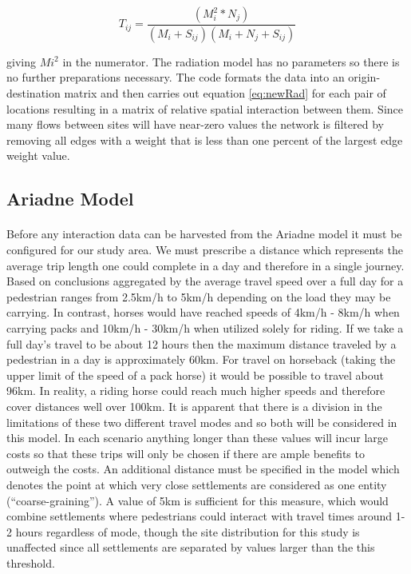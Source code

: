 \documentclass[12pt,a4paper]{thesis}
\begin{document}
				
				\begin{equation}						
				T_{ij} = \frac{(M_{i}^2*N_{j})}{(M_{i}+S_{ij})(M_{i}+N_{j}+S_{ij})}
				\label{eq:newRad}	
				\end{equation}
						
giving $Mi^2$ in the numerator. The radiation model has no parameters so there is no further preparations necessary. The code formats the data into an origin-destination matrix and then  carries out equation \ref{eq:newRad} for each pair of locations resulting in a matrix of relative spatial interaction between them. Since many flows between sites will have near-zero values the network is filtered by removing all edges with a weight that is less than one percent of the largest edge weight value. 

\subsection{Ariadne Model}
	
\paragraph{}
Before any interaction data can be harvested from the Ariadne model it must be configured for our study area. We must prescribe a distance which represents the average trip length one could complete in a day and therefore in a single journey. Based on conclusions aggregated by \cite{BevForthcoming} the average travel speed over a full day for a pedestrian ranges from 2.5km/h to 5km/h depending on the load they may be carrying. In contrast, horses would have reached speeds of 4km/h - 8km/h when carrying packs and 10km/h - 30km/h when utilized solely for riding. If we take a full day's travel to be about 12 hours then the maximum distance traveled by a pedestrian in a day is approximately 60km. For travel on horseback (taking the upper limit of the speed of a pack horse) it would be possible to travel about 96km. In reality, a riding horse could reach much higher speeds and therefore cover distances well over 100km. It is apparent that there is a division in the limitations of these two different travel modes and so both will be considered in this model. In each scenario anything longer than these values will incur large costs so that these trips will only be chosen if there are ample benefits to outweigh the costs. An additional distance must be specified in the model which denotes the point at which very close settlements are considered as one entity (``coarse-graining''). A value of 5km is sufficient for this measure, which would combine settlements where pedestrians could interact with travel times around 1-2 hours regardless of mode, though the site distribution for this study is unaffected since all settlements are separated by values larger than the this threshold. 
\end{document}
